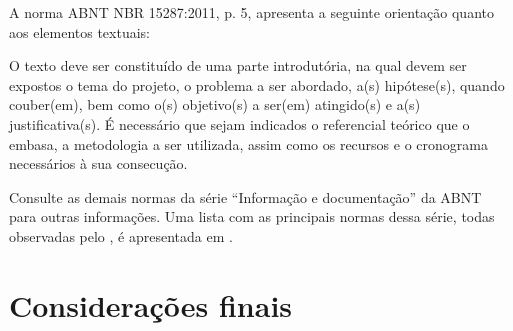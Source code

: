 \documentclass[
	12pt,				%
	openright,			%
	twoside,			%
	a4paper,			%
	english,			%
	french,				%
	spanish,			%
	brazil,				%
	]{abntex2}
\begin{document}
A norma ABNT NBR 15287:2011, p. 5, apresenta a
seguinte orientação quanto aos elementos textuais:

\begin{citacao}
O texto deve ser constituído de uma parte introdutória, na qual devem ser
expostos o tema do projeto, o problema a ser abordado, a(s) hipótese(s),
quando couber(em), bem como o(s) objetivo(s) a ser(em) atingido(s) e a(s)
justificativa(s). É necessário que sejam indicados o referencial teórico que
o embasa, a metodologia a ser utilizada, assim como os recursos e o cronograma
necessários à sua consecução.
\end{citacao}

Consulte as demais normas da série ``Informação e documentação'' da ABNT
para outras informações. Uma lista com as principais normas dessa série, todas
observadas pelo \abnTeX, é apresentada em .





\chapter*[Considerações finais]{Considerações finais}

\lipsum[31-33]

\postextual



%
%

\end{document}
